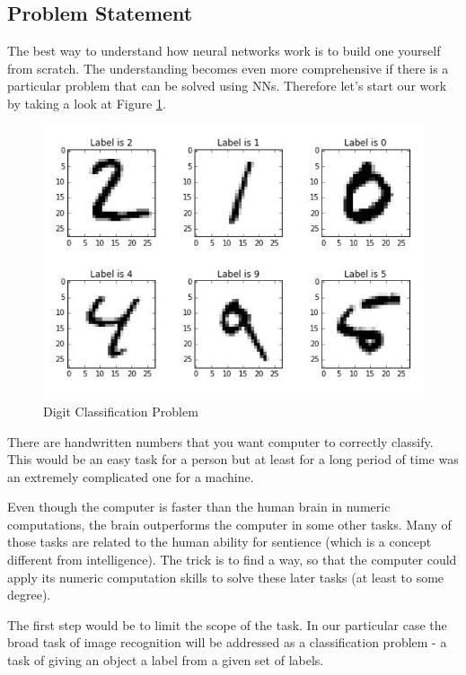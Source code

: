 \subsection{Problem Statement}

The best way to understand how neural networks work is to build one yourself from scratch. The understanding becomes even more comprehensive if there is a particular problem that can be solved using NNs. Therefore let's start our work by taking a look at Figure \ref{fig:digit-classification}.

\begin{figure}[H]
    \includegraphics[width=\linewidth]{pics/problem.png}
    \caption{\label{fig:digit-classification} Digit Classification Problem}
\end{figure}

There are handwritten numbers that you want computer to correctly classify. This would be an easy task for a person but at least for a long period of time was an extremely complicated one for a machine. 

Even though the computer is faster than the human brain in numeric computations, the brain outperforms the computer in some other tasks. Many of those tasks are related to the human ability for sentience (which is a concept different from intelligence). The trick is to find a way, so that the computer could apply its numeric computation skills to solve these later tasks (at least to some degree).

The first step would be to limit the scope of the task. In our particular case the broad task of image recognition will be addressed as a classification problem - a task of giving an object a label from a given set of labels.

